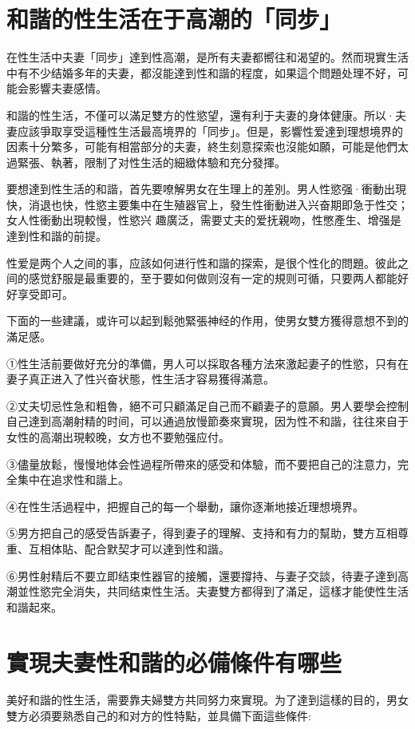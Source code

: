 \documentclass[12pt,UTF8]{ctexbook}
\begin{document}
\section{和諧的性生活在于高潮的「同步」}

在性生活中夫妻「同步」達到性高潮，是所有夫妻都嚮往和渴望的。然而現實生活中有不少结婚多年的夫妻，都沒能達到性和諧的程度，如果這个問題处理不好，可能会影響夫妻感情。

和諧的性生活，不僅可以滿足雙方的性慾望，還有利于夫妻的身体健康。所以·夫妻应該爭取享受這種性生活最高境界的「同步」。但是，影響性爱達到理想境界的因素十分繁多，可能有相當部分的夫妻，終生刻意探索也沒能如願，可能是他們太過緊張、執著，限制了对性生活的細緻体驗和充分發揮。

要想達到性生活的和諧，首先要嘹解男女在生理上的差別。男人性慾强·衝動出現快，消退也快，性慾主要集中在生殖器官上，發生性衝動进入兴奋期即急于性交；女人性衝動出現較慢，性慾兴
趣廣泛，需要丈夫的爱抚親吻，性憋產生、增强是達到性和諧的前提。

性爱是两个人之间的事，应該如何进行性和諧的探索，是很个性化的問題。彼此之间的感觉舒服是最重要的，至于要如何做则沒有一定的規则可循，只要两人都能好好享受即可。

下面的一些建議，或许可以起到鬆弛緊張神经的作用，使男女雙方獲得意想不到的滿足感。

①性生活前要做好充分的準備，男人可以採取各種方法來激起妻子的性慾，只有在妻子真正进入了性兴奋状態，性生活才容易獲得滿意。

②丈夫切忌性急和粗魯，絕不可只顧滿足自己而不顧妻子的意願。男人要學会控制自己達到高潮射精的时间，可以通過放慢節奏來實現，因为性不和諧，往往來自于女性的高潮出現較晚，女方也不要勉强应付。

③儘量放鬆，慢慢地体会性過程所帶來的感受和体驗，而不要把自己的注意力，完全集中在追求性和諧上。

④在性生活過程中，把握自己的每一个舉動，讓你逐漸地接近理想境界。

⑤男方把自己的感受告訴妻子，得到妻子的理解、支持和有力的幫助，雙方互相尊重、互相体貼、配合默契才可以達到性和諧。

⑥男性射精后不要立即结束性器官的接觸，還要撐持、与妻子交談，待妻子達到高潮並性慾完全消失，共同结束性生活。夫妻雙方都得到了滿足，這樣才能使性生活和諧起來。

\section{實現夫妻性和諧的必備條件有哪些}

美好和諧的性生活，需要靠夫婦雙方共同努力來實現。为了達到這樣的目的，男女雙方必須要熟悉自己的和对方的性特點，並具備下面這些條件:
\end{document}
